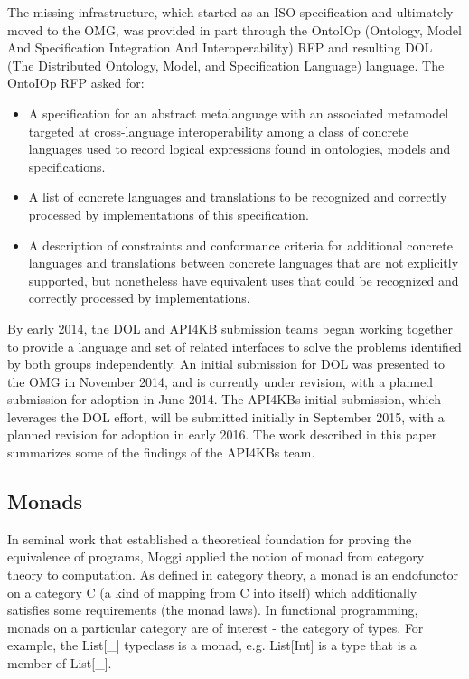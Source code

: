 \documentclass[runningheads]{llncs}
\begin{document}
The missing infrastructure, which started as an ISO specification and ultimately moved to the OMG, was provided in part through the OntoIOp (Ontology, Model And Specification Integration And Interoperability) RFP \cite{OntoIOp} and resulting DOL (The Distributed Ontology,
Model, and Specification
Language) language. The OntoIOp RFP asked for:
\begin {itemize}
\item A specification for an abstract metalanguage with an associated metamodel targeted at cross-language interoperability among a class of concrete languages used to record logical expressions found in ontologies, models and specifications.
\item A list of concrete languages and translations to be recognized and correctly processed by implementations of this specification. 
\item A description of constraints and conformance criteria for additional concrete languages and translations between concrete languages that are not explicitly supported, but nonetheless have equivalent uses that could be recognized and correctly processed by implementations.
\end{itemize}

By early 2014, the DOL and API4KB submission teams began working together to provide a language and set of related interfaces to solve the problems identified by both groups independently. An initial submission for DOL \cite{DOL} was presented to the OMG in November 2014, and is currently under revision, with a planned submission for adoption in June 2014.  The API4KBs initial submission, which leverages the DOL effort, will be submitted initially in September 2015, with a planned revision for adoption in early 2016.  The work described in this paper summarizes some of the findings of the API4KBs team.



\subsection{Monads}
In seminal work that established a theoretical foundation for proving the equivalence of programs, Moggi applied the notion of monad from category theory to computation.
As defined in category theory, a monad  is an endofunctor on a category C (a kind of mapping from C into itself) which additionally satisfies some requirements (the monad laws).
In functional programming, monads on a particular category are of interest - the category of types.
For example, the List[\_] typeclass is a monad, e.g. List[Int] is a type that is a member of List[\_].
\end{document}

